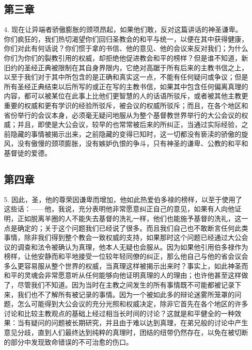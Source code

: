 
\subsection{第三章}

4. 现在让异端者骄傲膨胀的颈项昂起，如果他们敢，反对这篇讲话的神圣谦卑。你们疯狂的，我们热切渴望你们回归圣教会的和平与统一，以便在其中获得健康，你们对此有何话说？你们惯于拿的书信、他的意见、他的会议来反对我们；为什么你们为你们的裂教引用的权威，却拒绝他促进教会和平的榜样？但是谁不知道，新旧约的圣经正典被限制在其自身界限内，它绝对高踞于所有后来的主教书信之上，以至于我们对于其中所包含的是正确和真实这一点，不能有任何疑问或争议；但是所有圣经正典结束以后所写的或正在写的主教书信，如果其中包含任何偏离真理的内容，都可以被某位在此事上比他们更智慧的人的话语所驳斥，或者被其他主教更重要的权威和更有学识的经验所驳斥，被会议的权威所驳斥；而且，在各个地区和省份举行的会议本身，必须毫无疑问地服从为整个基督教世界举行的大公会议的权威；并且，即使是大公会议，较早的也常常被后来的所纠正，当通过实际经验，之前隐藏的事情被揭示出来，之前隐藏的变得已知时，这一切都没有亵渎的骄傲的旋风，没有傲慢的颈项膨胀，没有嫉妒仇恨的争斗，只有神圣的谦卑、公教的和平和基督徒的爱德。\par


\subsection{第四章}

5. 因此，圣，他的尊荣因谦卑而增加，他如此热爱伯多禄的榜样，以至于使用了这些话：——他，我说，充分表明他非常愿意纠正自己的意见，如果有人向他证明，正如脱离羊圈的人不能失去基督的洗礼一样，他们也能施予基督的洗礼，这一点是确定的；关于这个问题我们已经说了很多。而且我们自己也不敢断言任何此类事情，除非我们得到整个教会一致权威的支持，如果那时这个问题已经通过大公会议的调查和法令被确认为真理，他本人无疑也会服从。因为如果他引用伯多禄作为榜样，让他安静而和平地接受一位较年轻同僚的纠正，那么他自己与他的省会议会多么更容易服从整个世界的权威，当真理这样被揭示出来时？事实上，如此神圣而和平的灵魂会非常愿意听从任何能够向他证明真理的人的理由；也许他甚至这样做了，尽管我们不知道。因为当时在主教之间发生的所有事情既不可能都被记录下来，我们也不了解所有被记录的事情。因为一个被如此多的辩论迷雾所笼罩的问题，怎么可能得到大公会议的充分光照和权威决定，除非它首先在各个地区的许多讨论和比较主教观点的基础上经过相当长时间的讨论？这就是和平健全的一种效果：当有疑问的问题被长期研究，并且由于难以达到真理，在弟兄般的讨论中产生意见分歧，直到人们最终达到纯粹的真理时，团结的纽带仍然存在，以免在被切断的部分中发现致命错误的不可治愈的伤口。\par

